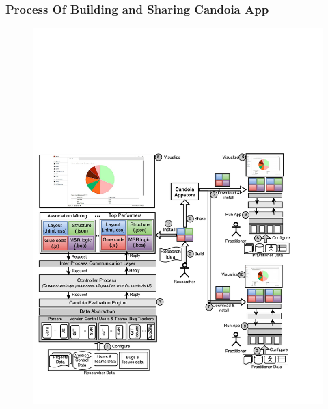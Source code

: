         \begin{frame}
            \frametitle{Process Of Building and Sharing Candoia App}
            \begin{figure}
                \centering
                \includegraphics[width=0.6\linewidth]{figures/overview.pdf}
            \end{figure}
        \end{frame}


